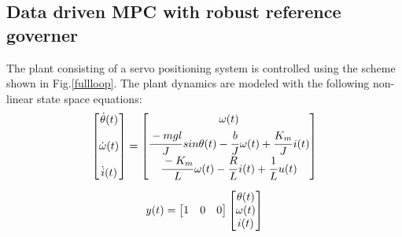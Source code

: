 \documentclass[letterpaper, 10 pt, conference]{ieeeconf}  %
\begin{document}
	\subsection{Data driven MPC with robust reference governer}
	The plant consisting of a servo positioning system is controlled using the scheme shown in Fig.\ref{fullloop}. The plant dynamics are modeled with the following non-linear state space equations:
	\begin{equation*}
	\begin{matrix}
	\begin{bmatrix}
	\dot{\theta}(t) \vspace{12pt} \\
	\dot{\omega}(t) \vspace{12pt} \\
	\dot{i}(t)
	\end{bmatrix} = 
	\begin{bmatrix}
	\omega(t) \vspace{3pt}\\
	\cfrac{-mgl}{J}\hspace{1pt}sin\theta(t)-\cfrac{b}{J}\hspace{1pt}\omega(t) + \cfrac{K_m}{J}\hspace{1pt}i(t) \\  
	\cfrac{-K_m}{L}\hspace{1pt}\omega(t)-\cfrac{R}{L}\hspace{1pt}i(t) + \cfrac{1}{L}\hspace{1pt}u(t)
	\end{bmatrix} \vspace{10pt}\\
	y(t) = \begin{bmatrix} 1 & 0 & 0 \end{bmatrix} 
	\begin{bmatrix} \theta(t) \\ \omega(t) \\ i(t) \end{bmatrix} 
	\end{matrix}
	\end{equation*}
	
\end{document}
